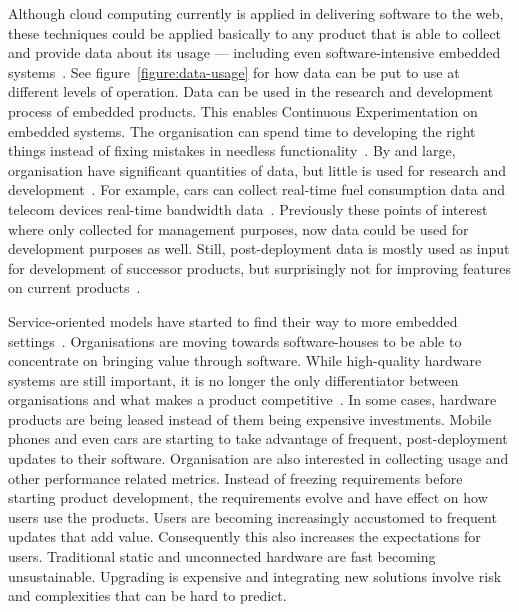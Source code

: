 \documentclass[english]{tktltiki2}
\begin{document}
Although cloud computing currently is applied in delivering software to the web, these techniques could be applied basically to any product that is able to collect and provide data about its usage — including even software-intensive embedded systems~\cite{BE12, Bos12}. See figure~\ref{figure:data-usage} for how data can be put to use at different levels of operation. Data can be used in the research and development process of embedded products. This enables Continuous Experimentation on embedded systems. The organisation can spend time to developing the right things instead of fixing mistakes in needless functionality~\cite{HAB12}. By and large, organisation have significant quantities of data, but little is used for research and development~\cite{HB14}. For example, cars can collect real-time fuel consumption data and telecom devices real-time bandwidth data~\cite{Bos12}. Previously these points of interest where only collected for management purposes, now data could be used for development purposes as well. Still, post-deployment data is mostly used as input for development of successor products, but surprisingly not for improving features on current products~\cite{HB14}.

Service-oriented models have started to find their way to more embedded settings~\cite{BE12, Bos12}. Organisations are moving towards software-houses to be able to concentrate on bringing value through software. While high-quality hardware systems are still important, it is no longer the only differentiator between organisations and what makes a product competitive~\cite{EHS14}. In some cases, hardware products are being leased instead of them being expensive investments. Mobile phones and even cars are starting to take advantage of frequent, post-deployment updates to their software. Organisation are also interested in collecting usage and other performance related metrics. Instead of freezing requirements before starting product development, the requirements evolve and have effect on how users use the products. Users are becoming increasingly accustomed to frequent updates that add value. Consequently this also increases the expectations for users. Traditional static and unconnected hardware are fast becoming unsustainable. Upgrading is expensive and integrating new solutions involve risk and complexities that can be hard to predict.
\end{document}
